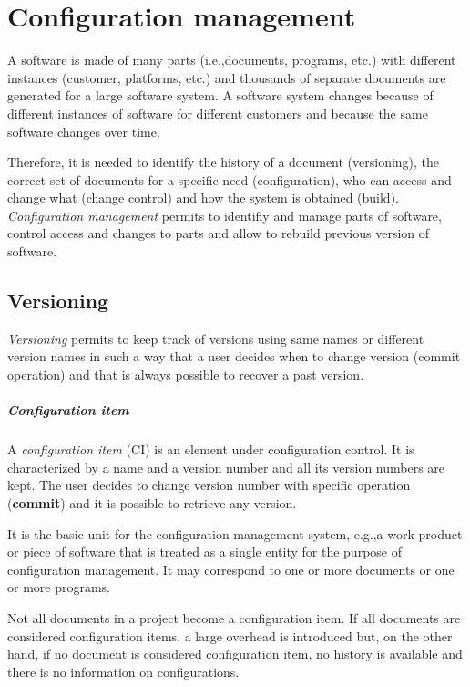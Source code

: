 \chapter{Configuration management}
A software is made of many parts (i.e.,\@ documents, programs, etc.) with different instances (customer, platforms, etc.) and thousands of separate documents are generated for a large software system. A software system changes because of different instances of software for different customers and because the same software changes over time.

Therefore, it is needed to identify the history of a document (versioning), the correct set of documents for a specific need (configuration), who can access and change what (change control) and how the system is obtained (build). \emph{Configuration management} permits to identifiy and manage parts of software, control access and changes to parts and allow to rebuild previous version of software.

\section{Versioning}
\emph{Versioning} permits to keep track of versions using same names or different version names in such a way that a user decides when to change version (commit operation) and that is always possible to recover a past version.

\paragraph{Configuration item}
A \emph{configuration item} (CI) is an element under configuration control. It is characterized by a name and a version number and all its version numbers are kept. The user decides to change version number with specific operation (\textbf{commit}) and it is possible to retrieve any version.

It is the basic unit for the configuration management system, e.g.,\@ a work product or piece of software that is treated as a single entity for the purpose of configuration management. It may correspond to one or more documents or one or more programs.

Not all documents in a project become a configuration item. If all documents are considered configuration items, a large overhead is introduced but, on the other hand, if no document is considered configuration item, no history is available and there is no information on configurations.

